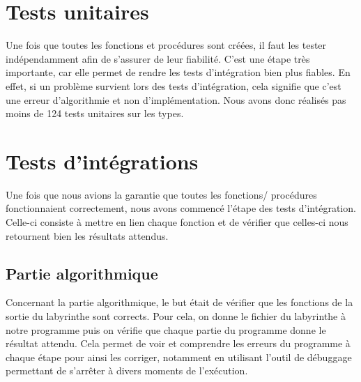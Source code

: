     \section{Tests unitaires}

        \vspace{2mm}
        Une fois que toutes les fonctions et procédures sont créées, il faut les tester indépendamment afin de s'assurer de leur fiabilité. C'est une étape très importante, car elle permet de rendre les tests d'intégration bien plus fiables. En effet, si un problème survient lors des tests d'intégration, cela signifie que c'est une erreur d'algorithmie et non d'implémentation. Nous avons donc réalisés pas moins de 124 tests unitaires sur les types. 
    \section{Tests d'intégrations}
        Une fois que nous avions la garantie que toutes les fonctions/ procédures fonctionnaient correctement, nous avons commencé l'étape des tests d'intégration. Celle-ci consiste à mettre en lien chaque fonction et de vérifier que celles-ci nous retournent bien les résultats attendus. 
        \subsection{Partie algorithmique}
            Concernant la partie algorithmique, le but était de vérifier que les fonctions de la sortie du labyrinthe sont corrects. Pour cela, on donne le fichier du labyrinthe à notre programme puis on vérifie que chaque partie du programme donne le résultat attendu.
            Cela permet de voir et comprendre les erreurs du programme à chaque étape pour ainsi les corriger, notamment en utilisant l'outil de débuggage permettant de s'arrêter à divers moments de l'exécution.\\

